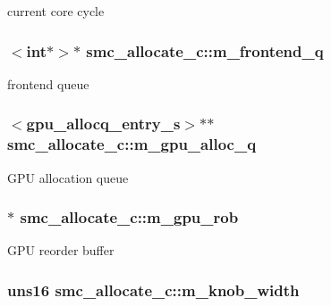 current core cycle \hypertarget{classsmc__allocate__c_a3db2b8a63184bcda1bd1d9a2231becf7}{
\subsubsection[{m\_\-frontend\_\-q}]{$<$int$\ast$$>$$\ast$ {\bf smc\_\-allocate\_\-c::m\_\-frontend\_\-q}}}
\label{classsmc__allocate__c_a3db2b8a63184bcda1bd1d9a2231becf7}
frontend queue \hypertarget{classsmc__allocate__c_ad36b7e814f1f2199295dce4d617ff035}{
\subsubsection[{m\_\-gpu\_\-alloc\_\-q}]{$<${\bf gpu\_\-allocq\_\-entry\_\-s}$>$$\ast$$\ast$ {\bf smc\_\-allocate\_\-c::m\_\-gpu\_\-alloc\_\-q}}}
\label{classsmc__allocate__c_ad36b7e814f1f2199295dce4d617ff035}
GPU allocation queue \hypertarget{classsmc__allocate__c_a8975102c918ebb18ff50b054d70fd1a3}{
\subsubsection[{m\_\-gpu\_\-rob}]{$\ast$ {\bf smc\_\-allocate\_\-c::m\_\-gpu\_\-rob}}}
\label{classsmc__allocate__c_a8975102c918ebb18ff50b054d70fd1a3}
GPU reorder buffer \hypertarget{classsmc__allocate__c_a5cdf0163de169d08e9b51a760381c66d}{
\subsubsection[{m\_\-knob\_\-width}]{\setlength{\rightskip}{0pt plus 5cm}uns16 {\bf smc\_\-allocate\_\-c::m\_\-knob\_\-width}}}
